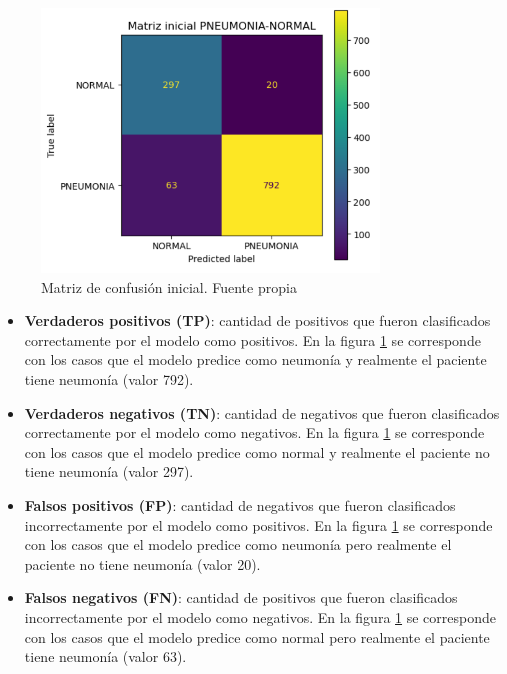 \begin{figure}[h]
    \centering
    \includegraphics[width=0.80\textwidth]{img/matriz_conf_inicial.PNG}
    \caption{Matriz de confusión inicial. Fuente propia}
    \label{fig:matriz_confusion_inicial}
\end{figure}

\begin{itemize} 
    \item \textbf{Verdaderos positivos (TP)}: cantidad de positivos que fueron clasificados correctamente por el modelo como positivos. En la figura \ref{fig:matriz_confusion_inicial} se corresponde con los casos que el modelo predice como neumonía y realmente el paciente tiene neumonía (valor 792).
    \item \textbf{Verdaderos negativos (TN)}: cantidad de negativos que fueron clasificados correctamente por el modelo como negativos. En la figura \ref{fig:matriz_confusion_inicial} se corresponde con los casos que el modelo predice como normal y realmente el paciente no tiene neumonía (valor 297).
    \item \textbf{Falsos positivos (FP)}: cantidad de negativos que fueron clasificados incorrectamente por el modelo como positivos. En la figura \ref{fig:matriz_confusion_inicial} se corresponde con los casos que el modelo predice como neumonía pero realmente el paciente no tiene neumonía (valor 20).
    \item \textbf{Falsos negativos (FN)}: cantidad de positivos que fueron clasificados incorrectamente por el modelo como negativos. En la figura \ref{fig:matriz_confusion_inicial} se corresponde con los casos que el modelo predice como normal pero realmente el paciente tiene neumonía (valor 63).
\end{itemize}

